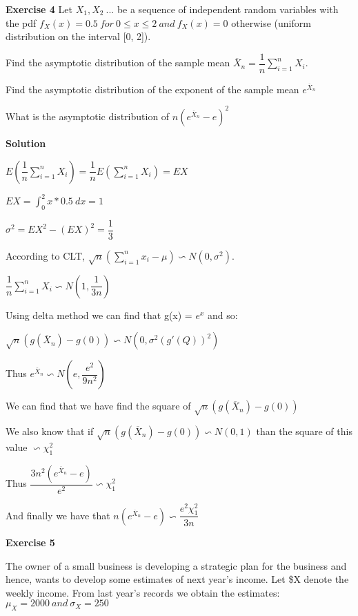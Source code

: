 \documentclass[12pt]{article}
\begin{document}
\bigskip

\textbf{Exercise 4}
Let $X_1,X_2\ ...$ be a sequence of independent random variables with the pdf $f_X(x)=0.5\ for\ 0 \leqslant x \leqslant 2\ and\ f_X(x)= 0$ otherwise (uniform distribution on the interval [0, 2]).

\begin{list}{()~}{}
\item
Find the asymptotic distribution of the sample mean $\overline{X}_n=\dfrac{1}{n} \sum^{n}_{i=1}X_i.$
\item
Find the asymptotic distribution of the exponent of the sample mean $e^{\overline{X}_n}$
\item
What is the asymptotic distribution of $n(e^{\overline{X}_n}-e)^2$
\end{list}
\medskip

\textbf{Solution}

\begin{list}{()~}{}
\item
$E(\dfrac{1}{n} \sum^{n}_{i=1}X_i)=\dfrac{1}{n} E(\sum^{n}_{i=1}X_i)=EX$

$EX = \int^{2}_{0}x*0.5\ dx = 1$

$\sigma^2=EX^2-(EX)^2=\dfrac{1}{3}$

According to CLT, $\sqrt{n}(\sum^{n}_{i=1}x_i-\mu) \backsim N(0, \sigma^2)$.

$\dfrac{1}{n} \sum^{n}_{i=1}X_i \backsim N(1, \dfrac{1}{3n})$
\item
Using delta method we can find that g(x) = $e^x$ and so:

$\sqrt{n}(g(\overline{X}_n)-g(0)) \backsim N(0, \sigma^2 (g'(Q))^2)$

Thus $e^{\overline{X}_n} \backsim N(e, \dfrac{e^2}{9n^2})$
\item
We can find that we have find the square of  $\sqrt{n}(g(\overline{X}_n)-g(0))$

We also know that if $\sqrt{n}(g(\overline{X}_n)-g(0)) \backsim N(0,1)$ than the square of this value $\backsim \chi^2_1$

Thus $\dfrac{3n^2(e^{\overline{X}_n} - e)}{e^2} \backsim \chi^2_1$

And finally we have that $n(e^{\overline{X}_n} - e) \backsim \dfrac{e^2\chi^2_1}{3n}$ 
\end{list}

\bigskip

\textbf{Exercise 5}

The owner of a small business is developing a strategic plan for the business and hence, wants to develop some estimates of next year’s income. Let \$X denote the weekly income. From last year’s records we obtain the estimates: $\mu_X=2000\ and\ \sigma_X=250$
\end{document}
